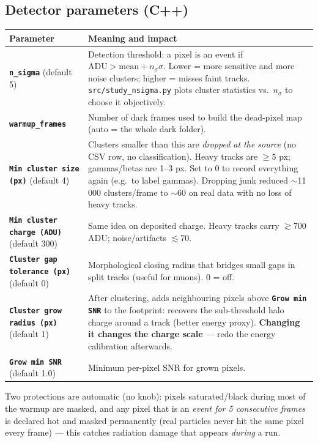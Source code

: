 \documentclass[11pt,a4paper]{article}
\newcommand{\param}[1]{\texttt{\textbf{#1}}}
\begin{document}
\subsection{Detector parameters (C++)}
\begin{longtable}{p{4.2cm}p{10.5cm}}
\toprule
\textbf{Parameter} & \textbf{Meaning and impact} \\
\midrule
\param{n\_sigma} (default 5) &
Detection threshold: a pixel is an event if
$\mathrm{ADU} > \mathrm{mean} + n_\sigma \sigma$. Lower = more sensitive
and more noise clusters; higher = misses faint tracks.
\texttt{src/study\_nsigma.py} plots cluster statistics vs.\ $n_\sigma$ to
choose it objectively. \\
\param{warmup\_frames} &
Number of dark frames used to build the dead-pixel map (auto = the whole
dark folder). \\
\param{Min cluster size (px)} (default 4) &
Clusters smaller than this are \emph{dropped at the source} (no CSV row, no
classification). Heavy tracks are $\geq 5$ px; gammas/betas are 1--3 px.
Set to 0 to record everything again (e.g.\ to label gammas). Dropping junk
reduced $\sim$11\,000 clusters/frame to $\sim$60 on real data with no loss
of heavy tracks. \\
\param{Min cluster charge (ADU)} (default 300) &
Same idea on deposited charge. Heavy tracks carry $\gtrsim 700$ ADU;
noise/artifacts $\lesssim 70$. \\
\param{Cluster gap tolerance (px)} (default 0) &
Morphological closing radius that bridges small gaps in split tracks
(useful for muons). 0 = off. \\
\param{Cluster grow radius (px)} (default 1) &
After clustering, adds neighbouring pixels above \param{Grow min SNR} to the
footprint: recovers the sub-threshold halo charge around a track (better
energy proxy). \textbf{Changing it changes the charge scale} --- redo the
energy calibration afterwards. \\
\param{Grow min SNR} (default 1.0) & Minimum per-pixel SNR for grown pixels. \\
\bottomrule
\end{longtable}

Two protections are automatic (no knob): pixels saturated/black during most
of the warmup are masked, and any pixel that is an \emph{event for 5
consecutive frames} is declared hot and masked permanently (real particles
never hit the same pixel every frame) --- this catches radiation damage that
appears \emph{during} a run.
\end{document}
